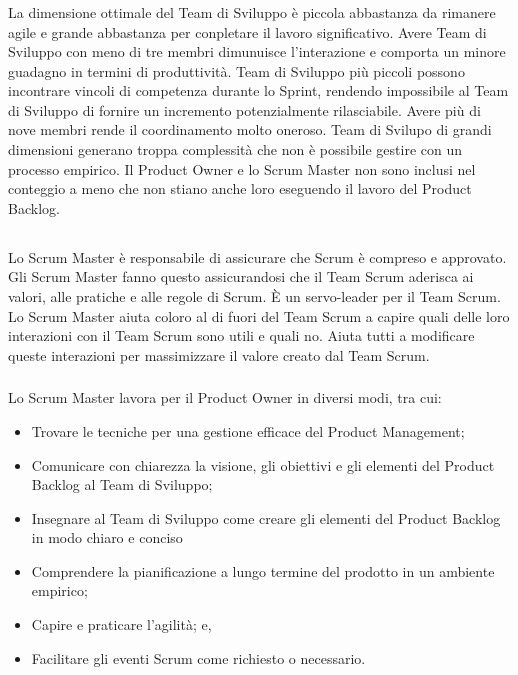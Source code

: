 \subsubsection*{\color{SteelBlue}{Dimensioni del Team di Sviluppo}} %
\label{ssub:development_team_size}
La dimensione ottimale del Team di Sviluppo \`e piccola abbastanza da rimanere agile e grande abbastanza per conpletare il 
lavoro  significativo. Avere Team di Sviluppo con meno di tre membri dimunuisce l'interazione e comporta un minore guadagno in 
termini di produttivit\`a. Team di Sviluppo pi\`u piccoli possono incontrare vincoli di competenza durante lo Sprint, rendendo  
impossibile al Team di Sviluppo di fornire un incremento potenzialmente rilasciabile. Avere pi\`u di nove membri rende il 
coordinamento molto oneroso. Team di Svilupo di grandi dimensioni generano troppa complessit\`a che non \`e possibile gestire 
con un processo empirico. Il Product Owner e lo Scrum Master non sono inclusi nel conteggio a meno che non stiano anche loro 
eseguendo il lavoro del Product Backlog.

\subsection*{\color{SteelBlue}{Lo Scrum Master}}%
\label{sec:scrummaster}
Lo Scrum Master \`e responsabile di assicurare che Scrum \`e compreso e approvato. Gli Scrum Master fanno questo assicurandosi 
che il Team Scrum aderisca ai valori, alle pratiche e alle regole di Scrum. \`E un servo-leader per il Team Scrum. \newline 
Lo Scrum Master aiuta coloro al di fuori del Team Scrum a capire quali delle loro interazioni con il Team Scrum sono utili e  
quali no. Aiuta tutti a modificare queste interazioni per massimizzare il valore creato dal Team Scrum.

\subsubsection*{\color{SteelBlue}{Servizio dello Scrum Master per il Product Owner}} %
\label{ssub:sm_service_to_po}
Lo Scrum Master lavora per il Product Owner in diversi modi, tra cui:
\begin{itemize}
	\item Trovare le tecniche per una gestione efficace del Product Management;
	\item Comunicare con chiarezza la visione, gli obiettivi e gli elementi del Product Backlog al Team di Sviluppo;
	\item Insegnare al Team di Sviluppo come creare gli elementi del Product Backlog in modo chiaro e conciso
	\item Comprendere la pianificazione a lungo termine del prodotto in un ambiente empirico;
	\item Capire e praticare l'agilit\`a; e,
	\item Facilitare gli eventi Scrum come richiesto o necessario.
\end{itemize}


